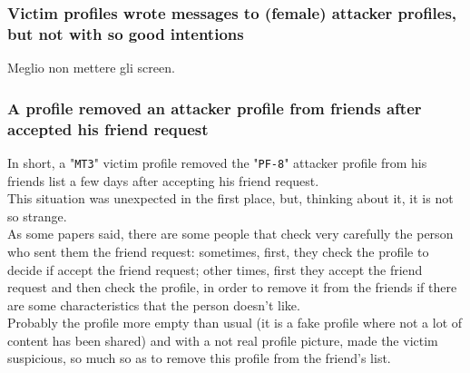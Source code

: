 \subsubsection*{Victim profiles wrote messages to (female) attacker profiles, but not with so good intentions}
Meglio non mettere gli screen.
\subsubsection*{A profile removed an attacker profile from friends after accepted his friend request}
\label{cap:discuss-removed-friends}
In short, a "\texttt{MT3}" victim profile removed the "\texttt{PF-8}" attacker profile from his friends list a few days after accepting his friend request.\\ 
This situation was unexpected in the first place, but, thinking about it, it is not so strange.\\As some papers said, there are some people that check very carefully the person who sent them the friend request: sometimes, first, they check the profile to decide if accept the friend request; other times, first they accept the friend request and then check the profile, in order to remove it from the friends if there are some characteristics that the person doesn't like.\\
Probably the profile more empty than usual (it is a fake profile where not a lot of content has been shared) and with a not real profile picture, made the victim suspicious, so much so as to remove this profile from the friend's list.
\newpage
